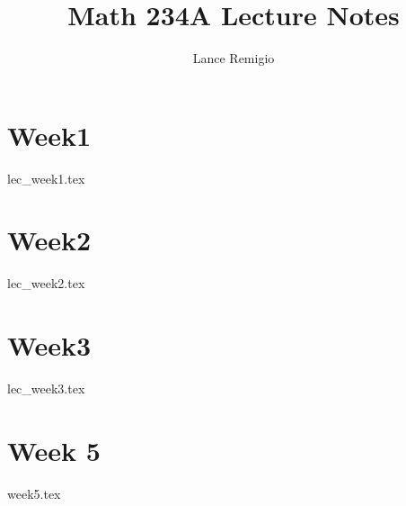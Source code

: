 \documentclass[a4paper]{report}
\title{Math 234A Lecture Notes}
\author{Lance Remigio}
\begin{document}
\maketitle    
\tableofcontents

\chapter{Week1}

{lec_week1.tex}

\chapter{Week2}

{lec_week2.tex}

\chapter{Week3}

{lec_week3.tex}

\chapter{Week 5}

{week5.tex}
\end{document}
